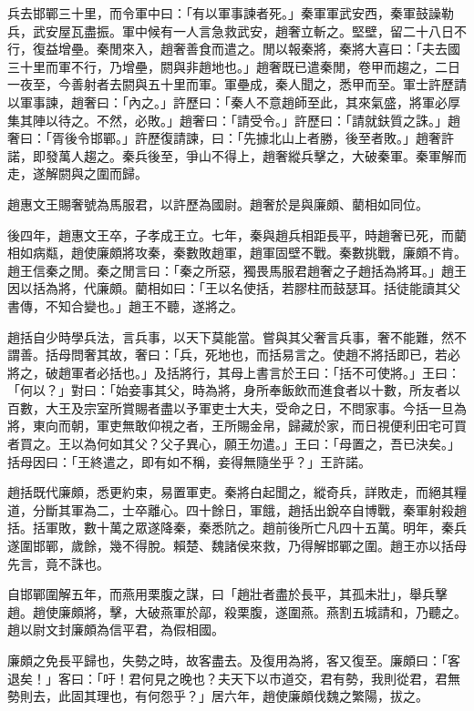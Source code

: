 \begin{pinyinscope}
兵去邯鄲三十里，而令軍中曰：「有以軍事諫者死。」秦軍軍武安西，秦軍鼓譟勒兵，武安屋瓦盡振。軍中候有一人言急救武安，趙奢立斬之。堅壁，留二十八日不行，復益增壘。秦閒來入，趙奢善食而遣之。閒以報秦將，秦將大喜曰：「夫去國三十里而軍不行，乃增壘，閼與非趙地也。」趙奢既已遣秦閒，卷甲而趨之，二日一夜至，今善射者去閼與五十里而軍。軍壘成，秦人聞之，悉甲而至。軍士許歷請以軍事諫，趙奢曰：「內之。」許歷曰：「秦人不意趙師至此，其來氣盛，將軍必厚集其陣以待之。不然，必敗。」趙奢曰：「請受令。」許歷曰：「請就鈇質之誅。」趙奢曰：「胥後令邯鄲。」許歷復請諫，曰：「先據北山上者勝，後至者敗。」趙奢許諾，即發萬人趨之。秦兵後至，爭山不得上，趙奢縱兵擊之，大破秦軍。秦軍解而走，遂解閼與之圍而歸。

趙惠文王賜奢號為馬服君，以許歷為國尉。趙奢於是與廉頗、藺相如同位。

後四年，趙惠文王卒，子孝成王立。七年，秦與趙兵相距長平，時趙奢已死，而藺相如病甐，趙使廉頗將攻秦，秦數敗趙軍，趙軍固壁不戰。秦數挑戰，廉頗不肯。趙王信秦之閒。秦之閒言曰：「秦之所惡，獨畏馬服君趙奢之子趙括為將耳。」趙王因以括為將，代廉頗。藺相如曰：「王以名使括，若膠柱而鼓瑟耳。括徒能讀其父書傳，不知合變也。」趙王不聽，遂將之。

趙括自少時學兵法，言兵事，以天下莫能當。嘗與其父奢言兵事，奢不能難，然不謂善。括母問奢其故，奢曰：「兵，死地也，而括易言之。使趙不將括即已，若必將之，破趙軍者必括也。」及括將行，其母上書言於王曰：「括不可使將。」王曰：「何以？」對曰：「始妾事其父，時為將，身所奉飯飲而進食者以十數，所友者以百數，大王及宗室所賞賜者盡以予軍吏士大夫，受命之日，不問家事。今括一旦為將，東向而朝，軍吏無敢仰視之者，王所賜金帛，歸藏於家，而日視便利田宅可買者買之。王以為何如其父？父子異心，願王勿遣。」王曰：「母置之，吾已決矣。」括母因曰：「王終遣之，即有如不稱，妾得無隨坐乎？」王許諾。

趙括既代廉頗，悉更約束，易置軍吏。秦將白起聞之，縱奇兵，詳敗走，而絕其糧道，分斷其軍為二，士卒離心。四十餘日，軍餓，趙括出銳卒自博戰，秦軍射殺趙括。括軍敗，數十萬之眾遂降秦，秦悉阬之。趙前後所亡凡四十五萬。明年，秦兵遂圍邯鄲，歲餘，幾不得脫。賴楚、魏諸侯來救，乃得解邯鄲之圍。趙王亦以括母先言，竟不誅也。

自邯鄲圍解五年，而燕用栗腹之謀，曰「趙壯者盡於長平，其孤未壯」，舉兵擊趙。趙使廉頗將，擊，大破燕軍於鄗，殺栗腹，遂圍燕。燕割五城請和，乃聽之。趙以尉文封廉頗為信平君，為假相國。

廉頗之免長平歸也，失勢之時，故客盡去。及復用為將，客又復至。廉頗曰：「客退矣！」客曰：「吁！君何見之晚也？夫天下以市道交，君有勢，我則從君，君無勢則去，此固其理也，有何怨乎？」居六年，趙使廉頗伐魏之繁陽，拔之。


\end{pinyinscope}
